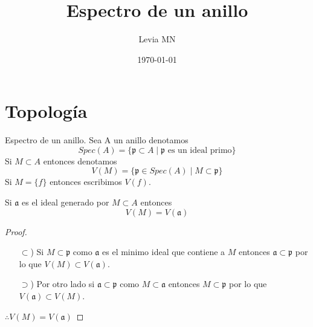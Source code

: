 \documentclass[14pt]{extarticle}
\title{Espectro de un anillo}
\author{Levia MN}
\date{\today}
\begin{document}
\maketitle
\section{Topología}

\begin{definicion}{Espectro de un anillo.}{}
    Sea A un anillo denotamos 
    $$Spec(A)=\{\mathfrak{p} \subset A \mid \mathfrak{p} \mbox{ es un ideal primo} \}$$
    Si $M \subset A$ entonces denotamos 
    $$V(M) = \{\mathfrak{p} \in Spec(A) \mid M \subset \mathfrak{p}\}$$
    Si $M=\{f\}$ entonces escribimos $V(f)$.
\end{definicion}

\begin{observacion}{}{}
    Si $\mathfrak{a}$ es el ideal generado por $M \subset A$ entonces
    $$V(M) = V(\mathfrak{a})$$
\end{observacion}
\begin{proof}
    \begin{enumerate}
        \item[$\subset$)]Si $M \subset \mathfrak{p}$ como $\mathfrak{a}$ es el minimo
        ideal que contiene a $M$ entonces $\mathfrak{a} \subset \mathfrak{p}$
        por lo que $V(M) \subset V(\mathfrak{a})$.
        \item[$\supset$)]Por otro lado si $\mathfrak{a} \subset \mathfrak{p}$ como
        $M \subset \mathfrak{a}$ entonces $M \subset \mathfrak{p}$
        por lo que $V(\mathfrak{a}) \subset V(M)$.
    \end{enumerate}
    $\therefore V(M) = V(\mathfrak{a})$
\end{proof}
\end{document}

